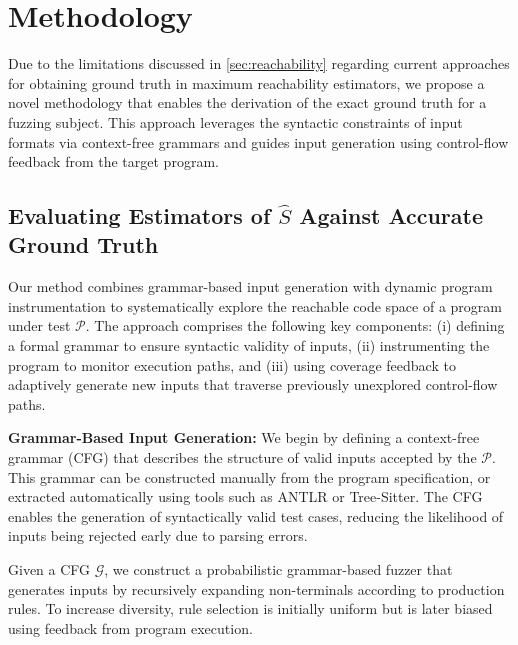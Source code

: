 \section{Methodology} \label{sec:method}



Due to the limitations discussed in \autoref{sec:reachability} regarding current approaches for obtaining ground truth in maximum reachability estimators, we propose a novel methodology that enables the derivation of the exact ground truth for a fuzzing subject. This approach leverages the syntactic constraints of input formats via context-free grammars and guides input generation using control-flow feedback from the target program.

\subsection{Evaluating Estimators of \texorpdfstring{$\hat{S}$}{S-hat} Against Accurate Ground Truth}

Our method combines grammar-based input generation with dynamic program instrumentation to systematically explore the reachable code space of a program under test $\mathcal{P}$. The approach comprises the following key components: (i) defining a formal grammar to ensure syntactic validity of inputs, (ii) instrumenting the program to monitor execution paths, and (iii) using coverage feedback to adaptively generate new inputs that traverse previously unexplored control-flow paths.
\vspace{0.5em}

\noindent\textbf{Grammar-Based Input Generation: }We begin by defining a context-free grammar (CFG) that describes the structure of valid inputs accepted by the $\mathcal{P}$. This grammar can be constructed manually from the program specification, or extracted automatically using tools such as ANTLR or Tree-Sitter. The CFG enables the generation of syntactically valid test cases, reducing the likelihood of inputs being rejected early due to parsing errors.

Given a CFG $\mathcal{G}$, we construct a probabilistic grammar-based fuzzer that generates inputs by recursively expanding non-terminals according to production rules. To increase diversity, rule selection is initially uniform but is later biased using feedback from program execution.
\vspace{0.5em}

